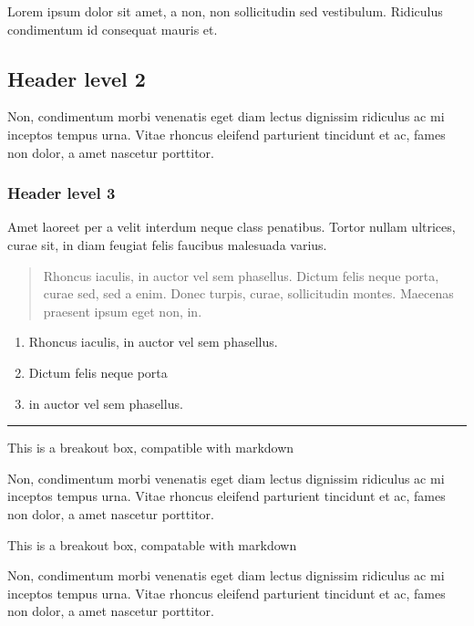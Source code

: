 \documentclass[
  oneside,
  12pt]{crumpbook}
\providecommand{\tightlist}{%
  \setlength{\itemsep}{0pt}\setlength{\parskip}{0pt}}
\begin{document}
Lorem ipsum dolor sit amet, a non, non sollicitudin sed vestibulum. Ridiculus condimentum id consequat mauris et.

\hypertarget{header-level-2}{%
\subsection{Header level 2}\label{header-level-2}}

Non, condimentum morbi venenatis eget diam lectus dignissim ridiculus ac mi inceptos tempus urna. Vitae rhoncus eleifend parturient tincidunt et ac, fames non dolor, a amet nascetur porttitor.

\hypertarget{header-level-3}{%
\subsubsection{Header level 3}\label{header-level-3}}

Amet laoreet per a velit interdum neque class penatibus. Tortor nullam ultrices, curae sit, in diam feugiat felis faucibus malesuada varius.

\begin{quote}
Rhoncus iaculis, in auctor vel sem phasellus. Dictum felis neque porta, curae sed, sed a enim. Donec turpis, curae, sollicitudin montes. Maecenas praesent ipsum eget non, in.
\end{quote}

\begin{enumerate}
\def\labelenumi{\arabic{enumi}.}
\tightlist
\item
  Rhoncus iaculis, in auctor vel sem phasellus.
\item
  Dictum felis neque porta
\item
  in auctor vel sem phasellus.
\end{enumerate}

\begin{center}\rule{0.5\linewidth}{0.5pt}\end{center}

This is a breakout box, compatible with markdown

Non, condimentum morbi venenatis eget diam lectus dignissim ridiculus ac mi inceptos tempus urna. Vitae rhoncus eleifend parturient tincidunt et ac, fames non dolor, a amet nascetur porttitor.

This is a breakout box, compatable with markdown

Non, condimentum morbi venenatis eget diam lectus dignissim ridiculus ac mi inceptos tempus urna. Vitae rhoncus eleifend parturient tincidunt et ac, fames non dolor, a amet nascetur porttitor.
\end{document}
